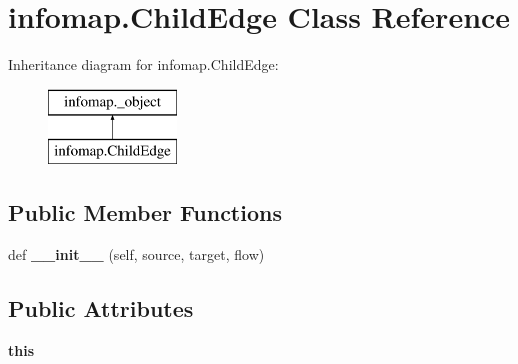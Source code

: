 \hypertarget{classinfomap_1_1ChildEdge}{}\section{infomap.\+Child\+Edge Class Reference}
\label{classinfomap_1_1ChildEdge}
Inheritance diagram for infomap.\+Child\+Edge\+:\begin{figure}[H]
\begin{center}
\leavevmode
\includegraphics[height=2.000000cm]{classinfomap_1_1ChildEdge}
\end{center}
\end{figure}
\subsection*{Public Member Functions}
\begin{DoxyCompactItemize}
\item 
\mbox{\label{classinfomap_1_1ChildEdge_ad03aadd2b42b603b00e8f96ce0acd3e1}} 
def {\bfseries \+\_\+\+\_\+init\+\_\+\+\_\+} (self, source, target, flow)
\end{DoxyCompactItemize}
\subsection*{Public Attributes}
\begin{DoxyCompactItemize}
\item 
\mbox{\label{classinfomap_1_1ChildEdge_a29e2b1ecc1531c41cbb6597dfc1b5e49}} 
{\bfseries this}
\end{DoxyCompactItemize}

